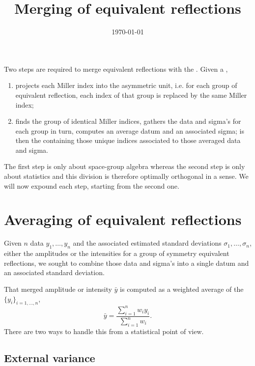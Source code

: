 \documentclass[11pt]{article}
\title{Merging of equivalent reflections}
\author{\lucjbourhis}
\date{\today}
\begin{document}
\maketitle

Two steps are required to merge equivalent reflections with the \cctbx . Given a  ,
\begin{enumerate}
\item {} projects each Miller index into the asymmetric unit, i.e. for each group of equivalent reflection, each index of that group is replaced by the same Miller index;
\item {} finds the group of identical Miller indices, gathers the data and sigma's for each group in turn, computes an average datum and an associated sigma;  is then the  containing those unique indices associated to those averaged data and sigma.
\end{enumerate}
The first step is only about space-group algebra whereas the second step is only about statistics and this division is therefore optimally orthogonal in a sense. We will now expound each step, starting from the second one.

\section{Averaging of equivalent reflections}

Given $n$ data $y_1, \ldots, y_n$ and the associated estimated standard deviations $\sigma_1, \ldots, \sigma_n$, either the amplitudes or the intensities for a group of symmetry equivalent reflections, we sought to combine those data and sigma's into a single datum and an associated standard deviation.

That merged amplitude or intensity $\bar{y}$ is computed as a weighted average of the $\{y_i\}_{i=1,\ldots,n}$,
\begin{equation}
\bar{y} = \frac{\sum_{i=1}^n w_i y_i}{\sum_{i=1}^n w_i} .
\label{eqn:average}
\end{equation}
There are two ways to handle this from a statistical point of view. 

\subsection{External variance}
\end{document}
